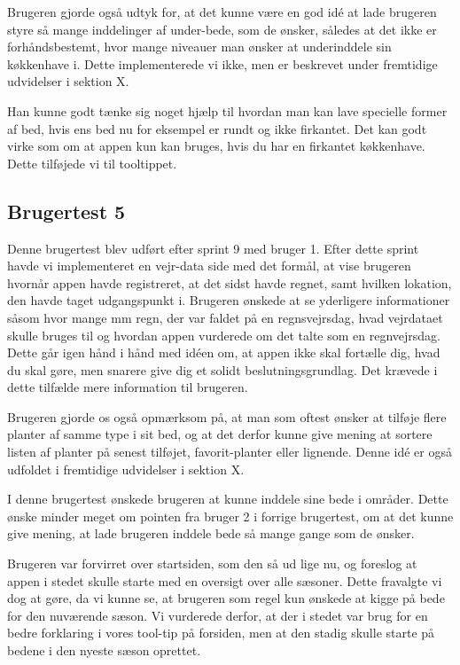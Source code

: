 Brugeren gjorde også udtyk for, at det kunne være en god idé at lade brugeren styre så mange inddelinger af under-bede, som de ønsker, således at det ikke er forhåndsbestemt, hvor mange niveauer man ønsker at underinddele sin køkkenhave i. Dette implementerede vi ikke, men er beskrevet under fremtidige udvidelser i sektion X.

Han kunne godt tænke sig noget hjælp til hvordan man kan lave specielle former af bed, hvis ens bed nu for eksempel er rundt og ikke firkantet. Det kan godt virke som om at appen kun kan bruges, hvis du har en firkantet køkkenhave. Dette tilføjede vi til tooltippet.

\subsection{Brugertest 5}
Denne brugertest blev udført efter sprint 9 med bruger 1. Efter dette sprint havde vi implementeret en vejr-data side med det formål, at vise brugeren hvornår appen havde registreret, at det sidst havde regnet, samt hvilken lokation, den havde taget udgangspunkt i. Brugeren ønskede at se yderligere informationer såsom hvor mange mm regn, der var faldet på en regnsvejrsdag, hvad vejrdataet skulle bruges til og hvordan appen vurderede om det talte som en regnvejrsdag. Dette går igen hånd i hånd med idéen om, at appen ikke skal fortælle dig, hvad du skal gøre, men snarere give dig et solidt beslutningsgrundlag. Det krævede i dette tilfælde mere information til brugeren.

Brugeren gjorde os også opmærksom på, at man som oftest ønsker at tilføje flere planter af samme type i sit bed, og at det derfor kunne give mening at sortere listen af planter på senest tilføjet, favorit-planter eller lignende. Denne idé er også udfoldet i fremtidige udvidelser i sektion X.

I denne brugertest ønskede brugeren at kunne inddele sine bede i områder. Dette ønske minder meget om pointen fra bruger 2 i forrige brugertest, om at det kunne give mening, at lade brugeren inddele bede så mange gange som de ønsker.

Brugeren var forvirret over startsiden, som den så ud lige nu, og foreslog at appen i stedet skulle starte med en oversigt over alle sæsoner. Dette fravalgte vi dog at gøre, da vi kunne se, at brugeren som regel kun ønskede at kigge på bede for den nuværende sæson. Vi vurderede derfor, at der i stedet var brug for en bedre forklaring i vores tool-tip på forsiden, men at den stadig skulle starte på bedene i den nyeste sæson oprettet.

